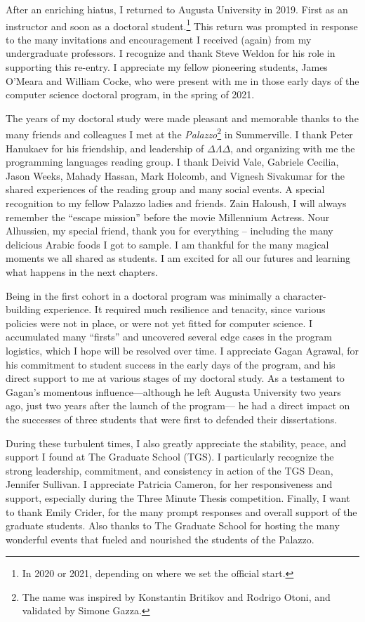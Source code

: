 After an enriching hiatus, I returned to Augusta University in 2019.
First as an instructor and soon as a doctoral student.\footnote{In 2020 or 2021, depending on where we set the official start.}
This return was prompted in response to the many invitations and encouragement I received (again) from my undergraduate professors.
I recognize and thank Steve Weldon for his role in supporting this re-entry.
I appreciate my fellow pioneering students, James O'Meara and William Cocke, who were present with me in those early days of the computer science doctoral program, in the spring of 2021.

The years of my doctoral study were made pleasant and memorable thanks to the many friends and colleagues I met at the \emph{Palazzo}\footnote{The name was inspired by Konstantin Britikov and Rodrigo Otoni, and validated by Simone Gazza.} in Summerville.
I thank Peter Hanukaev for his friendship, and leadership of $\Delta\Lambda\Delta$, and organizing with me the programming languages reading group.
I thank Deivid Vale, Gabriele Cecilia, Jason Weeks, Mahady Hassan, Mark Holcomb, and Vignesh Sivakumar for the shared experiences of the reading group and many social events.
A special recognition to my fellow Palazzo ladies and friends.
Zain Haloush, I will always remember the \enquote{escape mission} before the movie Millennium Actress.
Nour Alhussien, my special friend, thank you for everything -- including the many delicious Arabic foods I got to sample.
I am thankful for the many magical moments we all shared as students.
I am excited for all our futures and learning what happens in the next chapters.

Being in the first cohort in a doctoral program was minimally a character-building experience.
It required much resilience and tenacity, since various policies were not in place, or were not yet fitted for computer science.
I accumulated many \enquote{firsts} and uncovered several edge cases in the program logistics, which I hope will be resolved over time.
I appreciate Gagan Agrawal, for his commitment to student success in the early days of the program, and his direct support to me at various stages of my doctoral study.
As a testament to Gagan's momentous influence---although he left Augusta University two years ago, just two years after the launch of the program---%
he had a direct impact on the successes of three students that were first to defended their dissertations.

During these turbulent times, I also greatly appreciate the stability, peace, and support I found at The Graduate School (TGS).
I particularly recognize the strong leadership, commitment, and consistency in action of the TGS Dean, Jennifer Sullivan.
I appreciate Patricia Cameron, for her responsiveness and support, especially during the Three Minute Thesis competition.
Finally, I want to thank Emily Crider, for the many prompt responses and overall support of the graduate students.
Also thanks to The Graduate School for hosting the many wonderful events that fueled and nourished the students of the Palazzo.

